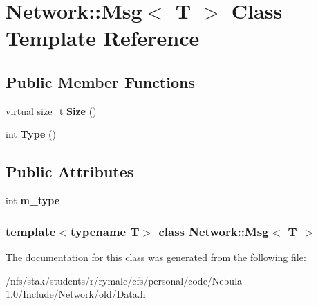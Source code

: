 \hypertarget{classNetwork_1_1Msg}{
\section{Network::Msg$<$ T $>$ Class Template Reference}
\label{classNetwork_1_1Msg}
}
\subsection*{Public Member Functions}
\begin{DoxyCompactItemize}
\item 
\hypertarget{classNetwork_1_1Msg_ac294bbb5834e575fb3bcdf40843e6529}{
virtual size\_\-t {\bfseries Size} ()}
\label{classNetwork_1_1Msg_ac294bbb5834e575fb3bcdf40843e6529}

\item 
\hypertarget{classNetwork_1_1Msg_abb586eee7a6ffa78516402029d234c7a}{
int {\bfseries Type} ()}
\label{classNetwork_1_1Msg_abb586eee7a6ffa78516402029d234c7a}

\end{DoxyCompactItemize}
\subsection*{Public Attributes}
\begin{DoxyCompactItemize}
\item 
\hypertarget{classNetwork_1_1Msg_a5c56266efb5c10e025aa77ce512e4b8c}{
int {\bfseries m\_\-type}}
\label{classNetwork_1_1Msg_a5c56266efb5c10e025aa77ce512e4b8c}

\end{DoxyCompactItemize}
\subsubsection*{template$<$typename T$>$ class Network::Msg$<$ T $>$}



The documentation for this class was generated from the following file:\begin{DoxyCompactItemize}
\item 
/nfs/stak/students/r/rymalc/cfs/personal/code/Nebula-\/1.0/Include/Network/old/Data.h\end{DoxyCompactItemize}
